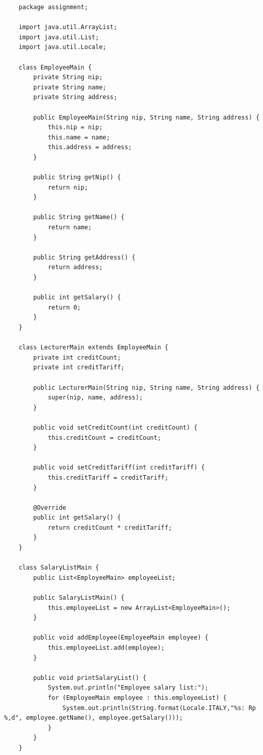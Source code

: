 \documentclass[12pt,titlepage]{article}
\begin{document}
\begin{verbatim}
    package assignment;

    import java.util.ArrayList;
    import java.util.List;
    import java.util.Locale;

    class EmployeeMain {
        private String nip;
        private String name;
        private String address;

        public EmployeeMain(String nip, String name, String address) {
            this.nip = nip;
            this.name = name;
            this.address = address;
        }

        public String getNip() {
            return nip;
        }

        public String getName() {
            return name;
        }

        public String getAddress() {
            return address;
        }

        public int getSalary() {
            return 0;
        }
    }

    class LecturerMain extends EmployeeMain {
        private int creditCount;
        private int creditTariff;

        public LecturerMain(String nip, String name, String address) {
            super(nip, name, address);
        }

        public void setCreditCount(int creditCount) {
            this.creditCount = creditCount;
        }

        public void setCreditTariff(int creditTariff) {
            this.creditTariff = creditTariff;
        }

        @Override
        public int getSalary() {
            return creditCount * creditTariff;
        }
    }

    class SalaryListMain {
        public List<EmployeeMain> employeeList;

        public SalaryListMain() {
            this.employeeList = new ArrayList<EmployeeMain>();
        }

        public void addEmployee(EmployeeMain employee) {
            this.employeeList.add(employee);
        }

        public void printSalaryList() {
            System.out.println("Employee salary list:");
            for (EmployeeMain employee : this.employeeList) {
                System.out.println(String.format(Locale.ITALY,"%s: Rp %,d", employee.getName(), employee.getSalary()));
            }
        }
    }


\end{verbatim}
\end{document}
